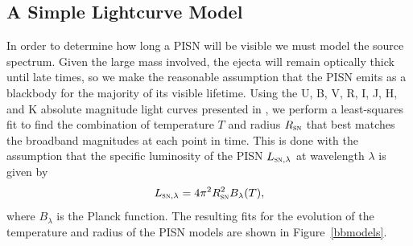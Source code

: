 \documentclass{thesis}
\newcommand{\RefFig}[1]{\mbox{Figure~\ref{#1}}}
\begin{document}
\subsection{A Simple Lightcurve Model}
In order to determine how long a PISN will be visible we must model
the source spectrum. Given the large mass involved, the ejecta will
remain optically thick until late times, so we make the reasonable
assumption that the PISN emits as a blackbody for the majority of its
visible lifetime.  Using the U, B, V, R, I, J, H, and K absolute
magnitude light curves presented in \citet{KasenWoosleyHeger2011}, we
perform a least-squares fit to find the combination of temperature $T$
and radius $R_{\textsc{sn}}$ that best matches the broadband
magnitudes at each point in time. This is done with the assumption
that the specific luminosity of the PISN $L_{\textsc{sn}, \lambda}$ at
wavelength $\lambda$ is given by
\begin{equation}
L_{\textsc{sn},\lambda} = 4\pi^2 R_{\textsc{sn}}^2 B_{\lambda}(T),
\end{equation}
where $B_{\lambda}$ is the Planck function. The resulting fits for the
evolution of the temperature and radius of the PISN models are shown in
\RefFig{bbmodels}.
\end{document}
